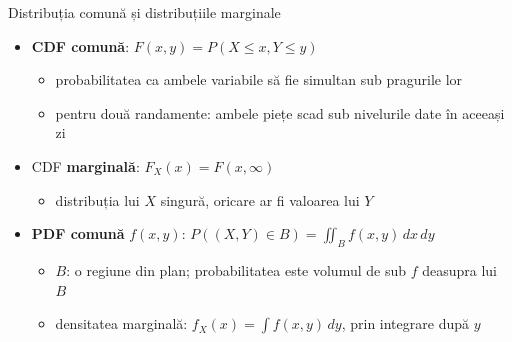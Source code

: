 \begin{frame}{Distribuția comună și distribuțiile marginale}
\itemsize{\small}
\begin{itemize}
    \item \textbf{CDF comună}: $F(x, y) = P(X \le x, Y \le y)$
    \begin{itemize}
        \item probabilitatea ca ambele variabile să fie simultan sub pragurile lor
        \item pentru două randamente: ambele piețe scad sub nivelurile date în aceeași zi
    \end{itemize}
    \item CDF \textbf{marginală}: $F_X(x) = F(x, \infty)$
    \begin{itemize}
        \item distribuția lui $X$ singură, oricare ar fi valoarea lui $Y$
    \end{itemize}
    \item \textbf{PDF comună} $f(x, y)$: $P((X, Y) \in B) = \iint_B f(x, y)\,dx\,dy$
    \begin{itemize}
        \item $B$: o regiune din plan; probabilitatea este volumul de sub $f$ deasupra lui $B$
        \item densitatea marginală: $f_X(x) = \int f(x, y)\,dy$, prin integrare după $y$
    \end{itemize}
\end{itemize}
\end{frame}

